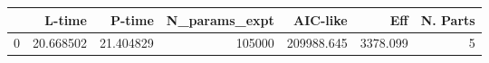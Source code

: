 \begin{tabular}{lrrrrrr}
\toprule
{} &     L-time &     P-time &  N\_params\_expt &    AIC-like &       Eff &  N. Parts \\
\midrule
0 &  20.668502 &  21.404829 &         105000 &  209988.645 &  3378.099 &         5 \\
\bottomrule
\end{tabular}
